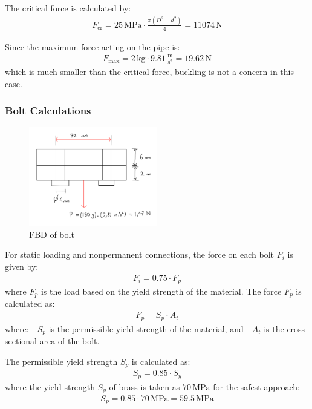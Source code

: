 \documentclass[12pt]{article}
\begin{document}
The critical force is calculated by:
\begin{align}
F_{\text{cr}} = 25 \, \text{MPa} \cdot \frac{\pi (D^2 - d^2)}{4} = 11074 \, \text{N}
\end{align}


Since the maximum force acting on the pipe is:
\begin{align}
F_{\text{max}} = 2 \, \text{kg} \cdot 9.81 \, \frac{\text{m}}{\text{s}^2} = 19.62 \, \text{N}
\end{align}
which is much smaller than the critical force, buckling is not a concern in this case.

\subsubsection{Bolt Calculations}
\begin{figure}[h]
    \centering
    \includegraphics[width=0.5\textwidth]{Figures/bolts.jpg}
    \caption{FBD of bolt}
    \label{fig:bolt}
\end{figure}

For static loading and nonpermanent connections, the force on each bolt \( F_i \) is given by:
\begin{align}
F_i = 0.75 \cdot F_p
\end{align}
where \( F_p \) is the load based on the yield strength of the material. The force \( F_p \) is calculated as:
\begin{align}
F_p = S_p \cdot A_t
\end{align}
where:
- \( S_p \) is the permissible yield strength of the material, and
- \( A_t \) is the cross-sectional area of the bolt.

The permissible yield strength \( S_p \) is calculated as:
\begin{align}
S_p = 0.85 \cdot S_y
\end{align}
where the yield strength \( S_y \) of brass is taken as \( 70 \, \text{MPa} \) for the safest approach:
\begin{align}
S_p = 0.85 \cdot 70 \, \text{MPa} = 59.5 \, \text{MPa}
\end{align}
\end{document}
